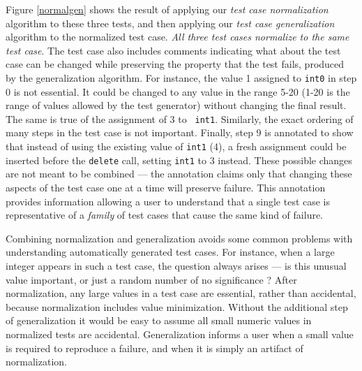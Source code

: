 Figure \ref{normalgen} shows the result of applying our \emph{test
  case normalization} algorithm to these three tests, and then
applying our \emph{test case generalization} algorithm to the
normalized test case.  \emph{All three test cases normalize to the
  same test case}.  The test case also includes comments indicating
what about the test case can be changed while preserving the property
that the test fails, produced by the generalization \cite{SmartCheck} algorithm.  For
instance, the value 1 assigned to {\tt int0} in step 0 is not
essential.  It could be changed to any value in the range 5-20 (1-20
is the range of values allowed by the test generator) without changing
the final result.  The same is true of the assignment of 3 to {\tt
  int1}.  Similarly, the exact ordering of many steps in the test case
is not important.  Finally, step 9 is annotated to show that instead
of using the existing value of {\tt int1} (4), a fresh assignment
could be inserted before the {\tt delete} call, setting {\tt int1} to
3 instead.  These possible changes are not meant to be combined ---
the annotation claims only that changing these aspects of the test
case one at a time will preserve failure.  This annotation provides
information allowing a user to understand that a single test case is
representative of a \emph{family} of test cases that cause the same
kind of failure.

Combining normalization and generalization avoids some common problems
with understanding automatically generated test cases.  For instance,
when a large integer appears in such a test case, the question always
arises --- is this unusual value important, or just a random number of
no significance \cite{MakeMost}?  After normalization, any large
values in a test case are essential, rather than
accidental, because normalization includes value minimization.
Without the additional step of generalization it would be
easy to assume all small numeric values in normalized
tests are accidental.  Generalization informs a user when a small
value is required to reproduce a failure, and when it is simply an
artifact of normalization.

